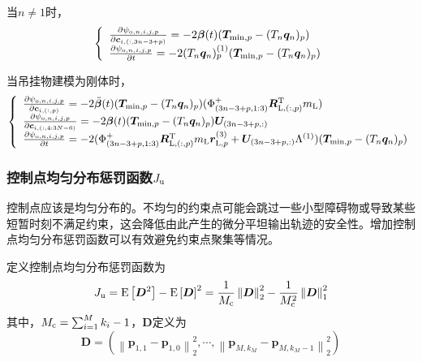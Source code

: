当$n \ne 1$时，
\begin{equation}
    \left\{\begin{array}{l}
        \frac{\partial \psi_{{\rm{o}}, n, i,j,p}}{\partial \boldsymbol{c}_{i,(:,3n-3+p)}} = -2{\boldsymbol{\beta}}(t)(\boldsymbol{T}_{\min, p} - (T_n\boldsymbol{q}_n)_p)\\
        \frac{\partial \psi_{{\rm{o}}, n, i,j,p}}{\partial t} = -2
            (T_n\boldsymbol{q}_n)^{(1)}_p
        (\boldsymbol{T}_{\min, p} - (T_n\boldsymbol{q}_n)_p)
    \end{array}
    \right.
\end{equation}

当吊挂物建模为刚体时，
\begin{equation}
    \left\{\begin{array}{l}
        \frac{\partial \psi_{{\rm{o}}, n,i,j,p}}{\partial \boldsymbol{c}_{i,(:,p)}} = -2\ddot{\boldsymbol{\beta}}(t)(\boldsymbol{T}_{\min, p} - (T_n\boldsymbol{q}_n)_p)(\Phi^{+}_{(3n-3+p,1:3)}\boldsymbol{R}^{\rm{T}}_{{\rm{L}}, (:,p)}m_{\rm{L}})\\
        \frac{\partial \psi_{{\rm{o}}, n,i,j,p}}{\partial \boldsymbol{c}_{i,(:,4:3N-6)}} = -2{\boldsymbol{\beta}}(t)(\boldsymbol{T}_{\min, p} - (T_n\boldsymbol{q}_n)_p) \boldsymbol{U}_{(3n-3+p, :)}\\
        \frac{\partial \psi_{{\rm{o}}, n,i,j,p}}{\partial t} = -2(
            \Phi^{+}_{(3n-3+p,1:3)}\boldsymbol{R}_{{\rm{L}},(:,p)}^{\rm{T}}m_{\rm{L}}\boldsymbol{r}_{{\rm{L}},p}^{(3)} + \boldsymbol{U}_{(3n-3+p, :)} {\Lambda}^{(1)}
        )(\boldsymbol{T}_{\min, p} - (T_n\boldsymbol{q}_n)_p)
    \end{array}
    \right.
\end{equation}

\subsubsection{控制点均匀分布惩罚函数$J_{\rm{u}}$}
控制点应该是均匀分布的。不均匀的约束点可能会跳过一些小型障碍物或导致某些短暂时刻不满足约束，这会降低由此产生的微分平坦输出轨迹的安全性。增加控制点均匀分布惩罚函数可以有效避免约束点聚集等情况。

定义控制点均匀分布惩罚函数为
\begin{equation}
    J_{\rm{u}} = {\rm{E}}\left[\boldsymbol{D}^2\right] - {\rm{E}}\left[\boldsymbol{D}\right]^2 = \frac{1}{M_{\rm{c}}}\left\| \boldsymbol{D} \right\|_2^2 - \frac{1}{M_{\rm{c}}^2}\left\| \boldsymbol{D} \right\|_1^2
\end{equation}
其中，$M_{\rm{c}} = \sum\nolimits_{i=1}^{M}k_i - 1$，$\boldsymbol{D}$定义为 
\begin{equation}
    \boldsymbol{D} = \left(
        \left\| \boldsymbol{p}_{1,1} - \boldsymbol{p}_{1,0} \right\|_2^2, \cdots,
        \left\| \boldsymbol{p}_{M,k_M} - \boldsymbol{p}_{M,k_M-1} \right\|_2^2 
    \right)
\end{equation}

